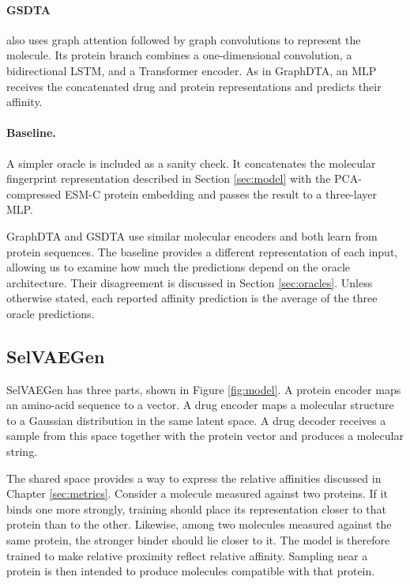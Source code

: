 \documentclass[a4paper,12pt]{article}
\begin{document}
\paragraph{GSDTA {\normalfont\parencite{Luo_Zhu_Xu_Xiao_Wei_Shen_2025}}} also uses graph attention followed by graph convolutions to represent the molecule. Its protein branch combines a one-dimensional convolution, a bidirectional LSTM, and a Transformer encoder. As in GraphDTA, an MLP receives the concatenated drug and protein representations and predicts their affinity.

\paragraph{Baseline.} A simpler oracle is included as a sanity check. It concatenates the molecular fingerprint representation described in Section \ref{sec:model} with the PCA-compressed ESM-C protein embedding \parencite{ESMTeam2024} and passes the result to a three-layer MLP.

GraphDTA and GSDTA use similar molecular encoders and both learn from protein sequences. The baseline provides a different representation of each input, allowing us to examine how much the predictions depend on the oracle architecture. Their disagreement is discussed in Section \ref{sec:oracles}. Unless otherwise stated, each reported affinity prediction is the average of the three oracle predictions.

\subsection{SelVAEGen}\label{sec:overview}\label{sec:varmod}\label{sec:model}

SelVAEGen has three parts, shown in Figure \ref{fig:model}. A protein encoder maps an amino-acid sequence to a vector. A drug encoder maps a molecular structure to a Gaussian distribution in the same latent space. A drug decoder receives a sample from this space together with the protein vector and produces a molecular string.

The shared space provides a way to express the relative affinities discussed in Chapter \ref{sec:metrics}. Consider a molecule measured against two proteins. If it binds one more strongly, training should place its representation closer to that protein than to the other. Likewise, among two molecules measured against the same protein, the stronger binder should lie closer to it. The model is therefore trained to make relative proximity reflect relative affinity. Sampling near a protein is then intended to produce molecules compatible with that protein.
\end{document}
